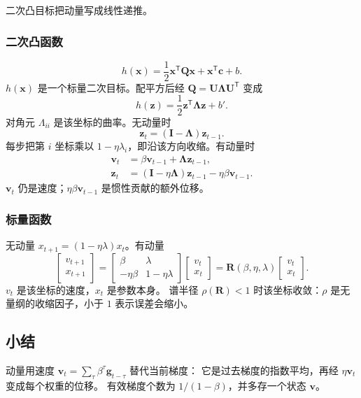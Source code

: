 二次凸目标把动量写成线性递推。

\subsubsection{二次凸函数}

\[
h(\bm{x})=\frac12\bm{x}^{\mathsf T}\bm{Q}\bm{x}+\bm{x}^{\mathsf T}\bm{c}+b.
\]
$h(\bm{x})$ 是一个标量二次目标。配平方后经 $\bm{Q}=\bm{U}\bm{\Lambda}\bm{U}^{\mathsf T}$ 变成
\[
h(\bm{z})=\frac12\bm{z}^{\mathsf T}\bm{\Lambda}\bm{z}+b'.
\]
对角元 $\Lambda_{ii}$ 是该坐标的曲率。无动量时
\[
\bm{z}_t=(\bm{I}-\bm{\Lambda})\bm{z}_{t-1}.
\]
每步把第 $i$ 坐标乘以 $1-\eta\lambda_i$，即沿该方向收缩。有动量时
\begin{align*}
\bm{v}_t&=\beta\bm{v}_{t-1}+\bm{\Lambda}\bm{z}_{t-1},
\\
\bm{z}_t&=(\bm{I}-\eta\bm{\Lambda})\bm{z}_{t-1}-\eta\beta\bm{v}_{t-1}.
\end{align*}
$\bm{v}_t$ 仍是速度；$\eta\beta\bm{v}_{t-1}$ 是惯性贡献的额外位移。

\subsubsection{标量函数}

无动量 $x_{t+1}=(1-\eta\lambda)x_t$。有动量
\[
\begin{bmatrix}v_{t+1}\\ x_{t+1}\end{bmatrix}
=
\begin{bmatrix}
\beta & \lambda\\
-\eta\beta & 1-\eta\lambda
\end{bmatrix}
\begin{bmatrix}v_t\\ x_t\end{bmatrix}
=\bm{R}(\beta,\eta,\lambda)
\begin{bmatrix}v_t\\ x_t\end{bmatrix}.
\]
$v_t$ 是该坐标的速度，$x_t$ 是参数本身。
谱半径 $\rho(\bm{R})<1$ 时该坐标收敛：$\rho$ 是无量纲的收缩因子，小于 $1$ 表示误差会缩小。

\subsection{小结}

动量用速度 $\bm{v}_t=\sum_{\tau}\beta^{\tau}\bm{g}_{t-\tau}$ 替代当前梯度：
它是过去梯度的指数平均，再经 $\eta\bm{v}_t$ 变成每个权重的位移。
有效梯度个数为 $1/(1-\beta)$，并多存一个状态 $\bm{v}$。

